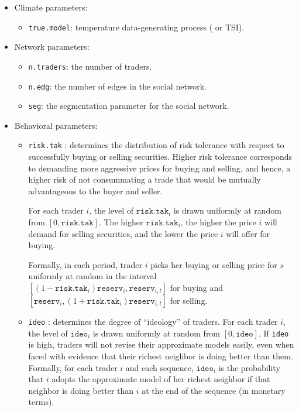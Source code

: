 \documentclass{article}\usepackage[]{graphicx}\usepackage[]{color}
\begin{document}
\begin{itemize}
  \item Climate parameters:
  \begin{itemize}
    \item  \texttt{true.model}: temperature data-generating process ( or TSI).
  \end{itemize}
  
  \item Network parameters:
  \begin{itemize}
    \item  \texttt{n.traders}: the number of traders.
    \item  \texttt{n.edg}: the number of edges in the social network.
    \item  \texttt{seg}: the segmentation parameter for the social network. 
  \end{itemize}
    
  \item Behavioral parameters:
  \begin{itemize}
    \item  \texttt{risk.tak} : determines the distribution of risk tolerance with respect to successfully buying or selling securities.     Higher risk tolerance corresponds to demanding more aggressive prices for buying and selling, and hence, a higher risk of not consummating a trade that would be mutually advantageous to the buyer and seller.
    
    For each trader $i$, the level of $\texttt{risk.tak}_i$ is drawn uniformly at random from $[0,\texttt{risk.tak}]$.
    The higher $\texttt{risk.tak}_i$, the higher the price $i$ will demand for selling securities, and the lower the price $i$ will offer for buying.
    
    Formally, in each period, trader $i$ picks her buying or selling price for $s$ uniformly at random in the interval  
    $[(1 - \texttt{risk.tak}_i) \texttt{reserv}_{i}, \allowbreak  \texttt{reserv}_{i,t}]$ for buying and 
    $[\texttt{reserv}_{i}, \allowbreak (1  + \texttt{risk.tak}_i) \texttt{reserv}_{i,t}]$ for selling. 
  
  \item  \texttt{ideo} :  determines the degree of ``ideology'' of traders.
    For each trader $i$, the level of $\texttt{ideo}_i$ is drawn uniformly at random from $[0,\texttt{ideo}]$.
    If \texttt{ideo} is high, traders will not revise their approximate models easily, even when faced with evidence that their richest neighbor is doing better than them. 
    Formally, for each trader $i$ and each sequence, $\texttt{ideo}_i$ is the probability that $i$ adopts the approximate model of her richest neighbor if that neighbor is doing better than $i$ at the end of the sequence (in monetary terms).
  \end{itemize}
\end{itemize}
\end{document}
